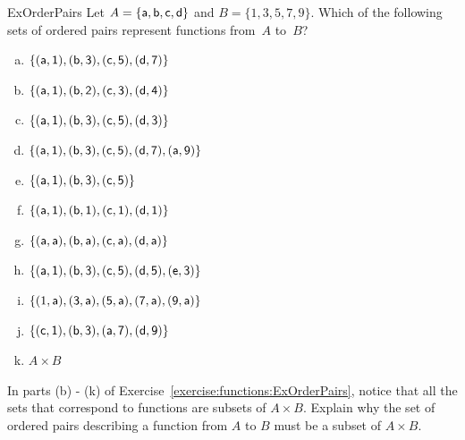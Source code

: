 \begin{exercise}{ExOrderPairs}
Let  $A = \{ \sf{a}, \sf{b}, \sf{c}, \sf{d} \}$ and  $B = \{1,3,5,7,9\}$.
Which of the following sets of ordered pairs represent functions from~$A$ to~$B$?

\begin{multicols}{2}
\begin{enumerate}[a.]
\item \label{WhichAreFuncsEx-a1b3c5d7e9}
$\{ (\sf{a}, 1), (\sf{b}, 3), (\sf{c}, 5), (\sf{d}, 7) \}$
\item \label{WhichAreFuncsEx-a1b2c3d4e5}
$\{ (\sf{a}, 1), (\sf{b}, 2), (\sf{c}, 3), (\sf{d}, 4) \}$
\item \label{WhichAreFuncsEx-a1b3c5d3e1}
$\{ (\sf{a}, 1), (\sf{b}, 3), (\sf{c}, 5), (\sf{d}, 3) \}$
\item \label{WhichAreFuncsEx-a1b3c5d7e9a11}
$\{ (\sf{a}, 1), (\sf{b}, 3), (\sf{c}, 5), (\sf{d}, 7), (\sf{a},9) \}$
\item \label{WhichAreFuncsEx-a1b3c5e7}
$\{ (\sf{a}, 1), (\sf{b}, 3), (\sf{c}, 5) \}$
\item \label{WhichAreFuncsEx-a1b1c1d1e1}
$\{ (\sf{a}, 1), (\sf{b}, 1), (\sf{c}, 1), (\sf{d}, 1) \}$
\item \label{WhichAreFuncsEx-aabacadaea}
$\{ (\sf{a}, \sf{a}), (\sf{b}, \sf{a}), (\sf{c}, \sf{a}), (\sf{d}, \sf{a}) \}$
\item \label{WhichAreFuncsEx-a1b3c5d5e3a1}
$\{ (\sf{a}, 1), (\sf{b}, 3), (\sf{c}, 5), (\sf{d}, 5), (\sf{e}, 3) \}$
\item \label{WhichAreFuncsEx-1a3a5a7a9a11a}
$\{ (1, \sf{a}), (3, \sf{a}), (5, \sf{a}), (7, \sf{a}), (9, \sf{a}) \}$
\item \label{WhichAreFuncsEx-c1b3e5a7d9}
$\{ (\sf{c}, 1), (\sf{b}, 3), (\sf{a}, 7), (\sf{d},9) \}$
\item \label{WhichAreFuncsExACrossB}
$A \times B$
\end{enumerate}
\end{multicols}
\end{exercise}

\begin{exercise}{}
In parts (b) - (k) of Exercise~\ref{exercise:functions:ExOrderPairs}, notice that all the sets that correspond to functions are subsets of $A \times B$.  Explain why the set of ordered pairs describing a function from $A$ to $B$ must be a subset of $A \times B$.
\end{exercise}

